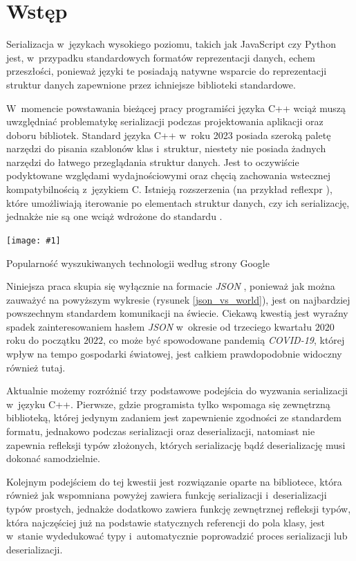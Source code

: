\documentclass[12pt]{article}
\newcommand{\n}{\newline}
\newcommand{\putfig}[3]{
\begin{captioned}[H]
	\centering
	\texttt{[image: \#1]}
	\caption{#2}
	\label{#3}
	\medskip
\end{captioned}
}
\newcommand{\nonpl}[1]{{\it #1}}
\newcommand{\JSON}{\nonpl{JSON} }
\begin{document}
	{
		\section{Wstęp}

		Serializacja w~językach wysokiego poziomu, takich jak JavaScript czy Python jest, w~przypadku standardowych formatów
		reprezentacji danych, echem przeszłości, ponieważ języki te posiadają natywne wsparcie do reprezentacji struktur danych
		zapewnione przez ichniejsze biblioteki standardowe.\n

		W~momencie powstawania bieżącej pracy programiści języka C++ wciąż muszą uwzględniać problematykę
		serializacji podczas projektowania aplikacji oraz doboru bibliotek. Standard języka C++ w~roku 2023 posiada szeroką
		paletę narzędzi do pisania szablonów klas i~struktur, niestety nie posiada żadnych narzędzi do łatwego przeglądania
		struktur danych. Jest to oczywiście podyktowane względami wydajnościowymi oraz chęcią zachowania wstecznej
		kompatybilnością z~językiem C. Istnieją rozszerzenia (na przykład reflexpr \cite*{cpp_extension_reflexpr_iso}), które
		umożliwiają iterowanie po elementach struktur danych, czy ich serializację, jednakże nie są one wciąż wdrożone do
		standardu \cite*{cpp_extension_reflexpr_short}.\n

		\putfig{./charts/output_with_charts_as_images/json_vs_other_formats.png}{ Popularność wyszukiwanych technologii według strony Google \cite*{google_trends_json_api_vs_rest_of_the_world}}{json_vs_world}

		Niniejsza praca skupia się wyłącznie na formacie \JSON\cite*{json_iso}, ponieważ jak można zauważyć na powyższym wykresie (rysunek \ref{json_vs_world}), jest on
		najbardziej powszechnym standardem komunikacji na świecie. Ciekawą kwestią jest wyraźny spadek zainteresowaniem hasłem \JSON w~okresie od
		trzeciego kwartału $2020$ roku do początku $2022$, co może być spowodowane pandemią \nonpl{COVID-19}, której wpływ na tempo gospodarki światowej,
		jest całkiem prawdopodobnie widoczny również tutaj.\n

		Aktualnie możemy rozróżnić trzy podstawowe podejścia do wyzwania serializacji w~języku C++. Pierwsze, gdzie programista tylko wspomaga się
		zewnętrzną biblioteką, której jedynym zadaniem jest zapewnienie zgodności ze standardem formatu, jednakowo podczas serializacji
		oraz deserializacji, natomiast nie zapewnia refleksji typów złożonych, których serializację bądź deserializację musi
		dokonać samodzielnie.\n

		Kolejnym podejściem do tej kwestii jest rozwiązanie oparte na bibliotece, która również jak wspomniana powyżej zawiera funkcję
		serializacji i~deserializacji typów prostych, jednakże dodatkowo zawiera funkcję zewnętrznej refleksji typów,
		która najczęściej już na podstawie statycznych referencji do pola klasy, jest w~stanie wydedukować typy i~automatycznie
		poprowadzić proces serializacji lub deserializacji.\n

}
\end{document}
